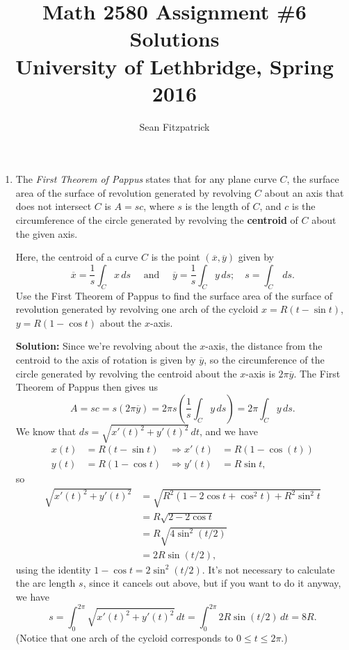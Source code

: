 \documentclass[letterpaper,12pt]{article}
\title{Math 2580 Assignment \#6 Solutions\\University of Lethbridge, Spring 2016}
\author{Sean Fitzpatrick}
\begin{document}
 \maketitle
\begin{enumerate}
\item The \textit{First Theorem of Pappus} states that for any plane curve $C$, the surface area of the surface of revolution generated by revolving $C$ about an axis that does not intersect $C$ is $A = sc$, where $s$ is the length of $C$, and $c$ is the circumference of the circle generated by revolving the \textbf{centroid} of $C$ about the given axis.

Here, the centroid of a curve $C$ is the point $(\overline{x},\overline{y})$ given by
\[
 \overline{x} = \frac{1}{s}\int_C x\,ds \quad \text{ and } \quad \overline{y} = \frac{1}{s}\int_C y\,ds; \quad s = \int_C\,ds.
\]
Use the First Theorem of Pappus to find the surface area of the surface of revolution generated by revolving one arch of the cycloid $x=R(t-\sin t)$, $y=R(1-\cos t)$ about the $x$-axis.

\bigskip

{\bf Solution:} Since we're revolving about the $x$-axis, the distance from the centroid to the axis of rotation is given by $\overline{y}$, so the circumference of the circle generated by revolving the centroid about the $x$-axis is $2\pi\overline{y}$. The First Theorem of Pappus then gives us
\[
 A = sc = s(2\pi \overline{y}) = 2\pi s\left(\frac{1}{s}\int_C y\,ds\right) = 2\pi\int_C y\,ds.
\]
We know that $ds = \sqrt{x'(t)^2+y'(t)^2}\,dt$, and we have
\begin{align*}
 x(t) & = R(t-\sin t) & \Rightarrow  x'(t) & = R(1-\cos(t))\\
 y(t) & = R(1-\cos t) & \Rightarrow  y'(t) &= R\sin t,
\end{align*}
so
\begin{align*}
 \sqrt{x'(t)^2+y'(t)^2} & = \sqrt{R^2(1-2\cos t+\cos^2t)+R^2\sin^2t}\\
& = R\sqrt{2-2\cos t}\\
& = R\sqrt{4\sin^2(t/2)}\\
& = 2R\sin(t/2),
\end{align*}
using the identity $1-\cos t = 2\sin^2(t/2)$. It's not necessary to calculate the arc length $s$, since it cancels out above, but if you want to do it anyway, we have
\[
 s = \int_0^{2\pi}\sqrt{x'(t)^2+y'(t)^2}\,dt = \int_0^{2\pi}2R\sin(t/2)\,dt = 8R.
\]
(Notice that one arch of the cycloid corresponds to $0\leq t\leq 2\pi$.)


\end{enumerate}
\end{document}
